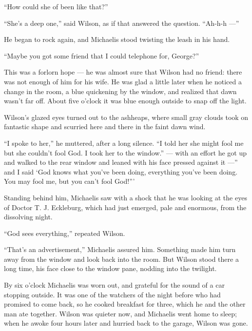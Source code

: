 \documentclass{znotebook}
\begin{document}
``How could she of been like that?''

``She's a deep one,'' said Wilson, as if that answered the question. ``Ah-h-h ---''

He began to rock again, and Michaelis stood twisting the leash in his hand.

``Maybe you got some friend that I could telephone for, George?''

This was a forlorn hope ---{} he was almost sure that Wilson had no friend: there was not enough of him for his wife. He was glad a little later when he noticed a change in the room, a blue quickening by the window, and realized that dawn wasn't far off. About five o'clock it was blue enough outside to snap off the light.

Wilson's glazed eyes turned out to the ashheaps, where small gray clouds took on fantastic shape and scurried here and there in the faint dawn wind.

``I spoke to her,'' he muttered, after a long silence. ``I told her she might fool me but she couldn't fool God. I took her to the window.'' ---{} with an effort he got up and walked to the rear window and leaned with his face pressed against it ---'' and I said ‘God knows what you've been doing, everything you've been doing. You may fool me, but you can't fool God!'''

Standing behind him, Michaelis saw with a shock that he was looking at the eyes of Doctor T. J. Eckleburg, which had just emerged, pale and enormous, from the dissolving night.

``God sees everything,'' repeated Wilson.

``That's an advertisement,'' Michaelis assured him. Something made him turn away from the window and look back into the room. But Wilson stood there a long time, his face close to the window pane, nodding into the twilight.

By six o'clock Michaelis was worn out, and grateful for the sound of a car stopping outside. It was one of the watchers of the night before who had promised to come back, so he cooked breakfast for three, which he and the other man ate together. Wilson was quieter now, and Michaelis went home to sleep; when he awoke four hours later and hurried back to the garage, Wilson was gone.
\end{document}
